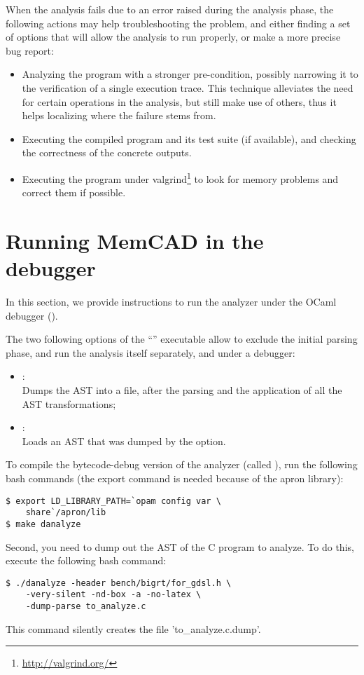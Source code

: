 When the analysis fails due to an error raised during the analysis
phase, the following actions may help troubleshooting the problem,
and either finding a set of options that will allow the analysis to
run properly, or make a more precise bug report:
\begin{itemize}
\item Analyzing the program with a stronger pre-condition, possibly
  narrowing it to the verification of a single execution trace.
  This technique alleviates the need for certain operations in the
  analysis, but still make use of others, thus it helps localizing
  where the failure stems from.
\item Executing the compiled program and its test suite (if available),
  and checking the correctness of the concrete outputs.
\item Executing the program under valgrind\footnote{
    \url{http://valgrind.org/}} to look for memory problems
  and correct them if possible.
\end{itemize}


\section{Running MemCAD in the debugger}
In this section, we provide instructions to run the \memcad
analyzer under the OCaml debugger ().

The two following options of the ``'' executable
allow to exclude the initial parsing phase, and run the analysis
itself separately, and under a debugger:
\begin{itemize}
\item[\soption{-dump-parse}]: \\
  Dumps the AST into a file, after the  parsing and the
  application of all the AST transformations;
\item[\soption{-load-dump}]: \\
  Loads an AST that was dumped by the  option.
\end{itemize}

To compile the bytecode-debug version of the analyzer (called
), run the following bash commands (the export
command is needed because of the apron library):
\begin{verbatim}
$ export LD_LIBRARY_PATH=`opam config var \
    share`/apron/lib
$ make danalyze
\end{verbatim}

Second, you need to dump out the AST of the C program to analyze.
To do this, execute the following bash command:
\begin{verbatim}
$ ./danalyze -header bench/bigrt/for_gdsl.h \
    -very-silent -nd-box -a -no-latex \
    -dump-parse to_analyze.c
\end{verbatim}
This command silently creates the file 'to\_analyze.c.dump'.

